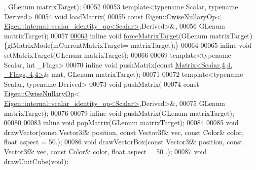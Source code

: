 \begin{DoxyCode}
      , GLenum matrixTarget);
00052 
00053     \textcolor{keyword}{template}<\textcolor{keyword}{typename} Scalar, \textcolor{keyword}{typename} Derived>
00054     \textcolor{keywordtype}{void} loadMatrix(
00055         \textcolor{keyword}{const} \hyperlink{group___core___module_class_eigen_1_1_cwise_nullary_op}{Eigen::CwiseNullaryOp}<
      \hyperlink{struct_eigen_1_1internal_1_1scalar__identity__op}{Eigen::internal::scalar\_identity\_op<Scalar>},Derived>&,
00056         GLenum matrixTarget);
00057 
\hyperlink{class_gpu_helper_a52a9ab12d07acbf4ad80737595a9b06e}{00063}     \textcolor{keyword}{inline} \textcolor{keywordtype}{void} \hyperlink{class_gpu_helper_a52a9ab12d07acbf4ad80737595a9b06e}{forceMatrixTarget}(GLenum matrixTarget) \{glMatrixMode(mCurrentMatrixTarget=
      matrixTarget);\}
00064 
00065     \textcolor{keyword}{inline} \textcolor{keywordtype}{void} setMatrixTarget(GLenum matrixTarget);
00066 
00069     \textcolor{keyword}{template}<\textcolor{keyword}{typename} Scalar, \textcolor{keywordtype}{int} \_Flags>
00070     \textcolor{keyword}{inline} \textcolor{keywordtype}{void} pushMatrix(\textcolor{keyword}{const} \hyperlink{group___core___module_class_eigen_1_1_matrix}{Matrix<Scalar,4,4, \_Flags, 4,4>}& mat, 
      GLenum matrixTarget);
00071 
00072     \textcolor{keyword}{template}<\textcolor{keyword}{typename} Scalar, \textcolor{keyword}{typename} Derived>
00073     \textcolor{keywordtype}{void} pushMatrix(
00074         \textcolor{keyword}{const} \hyperlink{group___core___module_class_eigen_1_1_cwise_nullary_op}{Eigen::CwiseNullaryOp}<
      \hyperlink{struct_eigen_1_1internal_1_1scalar__identity__op}{Eigen::internal::scalar\_identity\_op<Scalar>},Derived>&,
00075         GLenum matrixTarget);
00076 
00079     \textcolor{keyword}{inline} \textcolor{keywordtype}{void} pushMatrix(GLenum matrixTarget);
00080 
00083     \textcolor{keyword}{inline} \textcolor{keywordtype}{void} popMatrix(GLenum matrixTarget);
00084 
00085     \textcolor{keywordtype}{void} drawVector(\textcolor{keyword}{const} Vector3f& position, \textcolor{keyword}{const} Vector3f& vec, \textcolor{keyword}{const} Color& color, \textcolor{keywordtype}{float} aspect = 50.);
00086     \textcolor{keywordtype}{void} drawVectorBox(\textcolor{keyword}{const} Vector3f& position, \textcolor{keyword}{const} Vector3f& vec, \textcolor{keyword}{const} Color& color, \textcolor{keywordtype}{float} aspect = 50
      .);
00087     \textcolor{keywordtype}{void} drawUnitCube(\textcolor{keywordtype}{void});

\end{DoxyCode}
